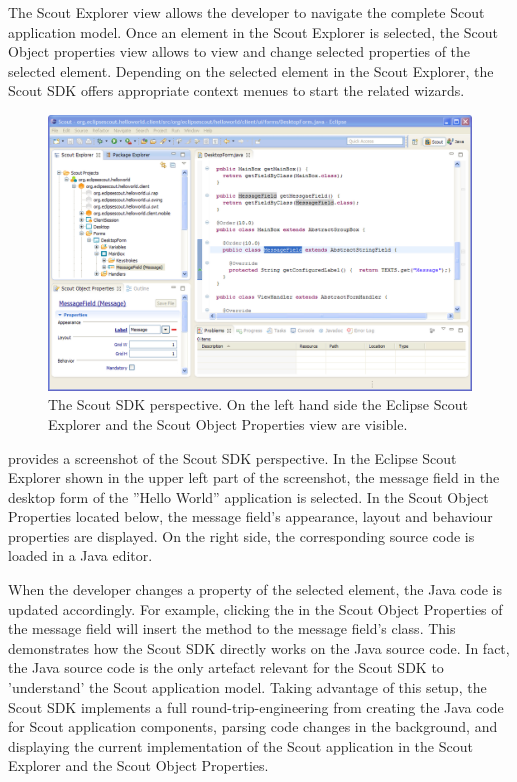 \documentclass[a4paper,10pt,twoside]{book}
\begin{document}
The Scout Explorer view allows the developer to navigate the complete Scout application model. 
Once an element in the Scout Explorer is selected, the Scout Object properties view allows to view and change selected properties of the selected element. 
Depending on the selected element in the Scout Explorer, the Scout SDK offers appropriate context menues to start the related wizards.

\begin{figure}
\includegraphics[width=14cm]{scout_sdk_perspective.png} 
\caption{The Scout SDK perspective. On the left hand side the Eclipse Scout Explorer and the Scout Object Properties view are visible.}
\end{figure}

 provides a screenshot of the Scout SDK perspective. 
In the Eclipse Scout Explorer shown in the upper left part of the screenshot, the message field in the desktop form of the ''Hello World'' application is selected. 
In the Scout Object Properties located below, the message field's appearance, layout and behaviour properties are displayed. 
On the right side, the corresponding source code is loaded in a Java editor. 

When the developer changes a property of the selected element, the Java code is updated accordingly. 
For example, clicking the  in the Scout Object Properties of the message field will insert the method  to the message field's class. 
This demonstrates how the Scout SDK directly works on the Java source code. 
In fact, the Java source code is the only artefact relevant for the Scout SDK to 'understand' the Scout application model. 
Taking advantage of this setup, the Scout SDK implements a full round-trip-engineering from creating the Java code for Scout application components, parsing code changes in the background, and displaying the current implementation of the Scout application in the Scout Explorer and the Scout Object Properties.
\end{document}
